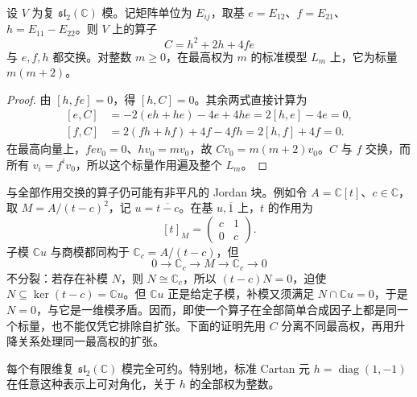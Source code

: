 \begin{lemma}\label{b5:lem:sl2-casimir-operator}
	设 \(V\) 为复 \(\mathfrak{sl}_2(\mathbb C)\) 模。记矩阵单位为 \(E_{ij}\)，取基 \(e=E_{12}\)、\(f=E_{21}\)、\(h=E_{11}-E_{22}\)。则 \(V\) 上的算子
	\[
		C=h^2+2h+4fe
	\]
	与 \(e,f,h\) 都交换。对整数 \(m\ge0\)，在最高权为 \(m\) 的标准模型 \(L_m\) 上，它为标量 \(m(m+2)\)。
\end{lemma}
\begin{proof}
	由 \([h,fe]=0\)，得 \([h,C]=0\)。其余两式直接计算为
	\[
		\begin{aligned}
			[e,C]&=-2(eh+he)-4e+4he=2[h,e]-4e=0,\\
			[f,C]&=2(fh+hf)+4f-4fh=2[h,f]+4f=0.
		\end{aligned}
	\]
	在最高向量上，\(fev_0=0\)、\(hv_0=mv_0\)，故 \(Cv_0=m(m+2)v_0\)。\(C\) 与 \(f\) 交换，而所有 \(v_i=f^iv_0\)，所以这个标量作用遍及整个 \(L_m\)。
\end{proof}
与全部作用交换的算子仍可能有非平凡的 Jordan 块。例如令 \(A=\mathbb C[t]\)、\(c\in\mathbb C\)，取 \(M=A/(t-c)^2\)，记 \(u=\overline{t-c}\)。在基 \(u,\overline1\) 上，\(t\) 的作用为
\[
	[t]_M=\begin{pmatrix}c&1\\0&c\end{pmatrix}.
\]
子模 \(\mathbb Cu\) 与商模都同构于 \(\mathbb C_c=A/(t-c)\)，但
\[
	0\longrightarrow\mathbb C_c\longrightarrow M \longrightarrow\mathbb C_c\longrightarrow0
\]
不分裂：若存在补模 \(N\)，则 \(N\cong\mathbb C_c\)，所以 \((t-c)N=0\)，迫使 \(N\subseteq\ker(t-c)=\mathbb Cu\)。但 \(\mathbb Cu\) 正是给定子模，补模又须满足 \(N\cap\mathbb Cu=0\)，于是 \(N=0\)，与它是一维模矛盾。因而，即使一个算子在全部简单合成因子上都是同一个标量，也不能仅凭它排除自扩张。下面的证明先用 \(C\) 分离不同最高权，再用升降关系处理同一最高权的扩张。
\begin{theorem}\label{b5:thm:sl2-complete-reducibility}
	每个有限维复 \(\mathfrak{sl}_2(\mathbb C)\) 模完全可约。特别地，标准 Cartan 元 \(h=\operatorname{diag}(1,-1)\) 在任意这种表示上可对角化，关于 \(h\) 的全部权为整数。
\end{theorem}
